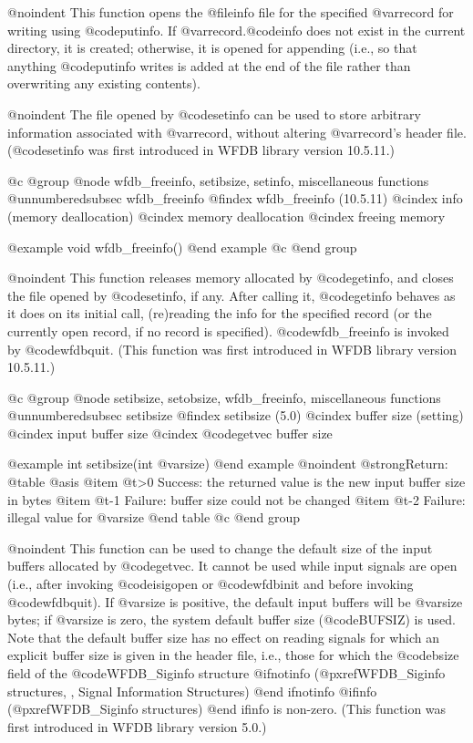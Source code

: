 {{{{{{{{{@noindent
This function opens the @file{info} file for the specified @var{record} for
writing using @code{putinfo}.  If @var{record}.@code{info} does not exist in
the current directory, it is created;  otherwise, it is opened for appending
(i.e., so that anything @code{putinfo} writes is added at the end of the
file rather than overwriting any existing contents).

@noindent
The file opened by @code{setinfo} can be used to store arbitrary information
associated with @var{record}, without altering @var{record}'s header file.
(@code{setinfo} was first introduced in WFDB library version 10.5.11.)

@c @group
@node     wfdb_freeinfo, setibsize, setinfo, miscellaneous functions
@unnumberedsubsec wfdb_freeinfo
@findex wfdb_freeinfo (10.5.11)
@cindex info (memory deallocation)
@cindex memory deallocation
@cindex freeing memory

@example
void wfdb_freeinfo()
@end example
@c @end group

@noindent
This function releases memory allocated by @code{getinfo}, and closes
the file opened by @code{setinfo}, if any.  After calling it, @code{getinfo}
behaves as it does on its initial call, (re)reading the info for the specified
record (or the currently open record, if no record is specified).
@code{wfdb_freeinfo} is invoked by @code{wfdbquit}.
(This function was first introduced in WFDB library version 10.5.11.)

@c @group
@node     setibsize, setobsize, wfdb_freeinfo, miscellaneous functions
@unnumberedsubsec setibsize
@findex setibsize (5.0)
@cindex buffer size (setting)
@cindex input buffer size
@cindex @code{getvec} buffer size

@example
int setibsize(int @var{size})
@end example
@noindent
@strong{Return:}
@table @asis
@item @t{>0}
Success: the returned value is the new input buffer size in bytes
@item @t{-1}
Failure: buffer size could not be changed
@item @t{-2}
Failure: illegal value for @var{size}
@end table
@c @end group

@noindent
This function can be used to change the default size of the input
buffers allocated by @code{getvec}.  It cannot be used while input
signals are open (i.e., after invoking @code{isigopen} or @code{wfdbinit}
and before invoking @code{wfdbquit}).  If @var{size} is positive, the
default input buffers will be @var{size} bytes;  if @var{size} is zero,
the system default buffer size (@code{BUFSIZ}) is used.  Note that
the default buffer size has no effect on reading signals for which
an explicit buffer size is given in the header file, i.e.,
those for which the @code{bsize} field of the @code{WFDB_Siginfo} structure
@ifnotinfo
(@pxref{WFDB_Siginfo structures, , Signal Information Structures})
@end ifnotinfo
@ifinfo
(@pxref{WFDB_Siginfo structures})
@end ifinfo
is non-zero.
(This function was first introduced in WFDB library version 5.0.)

}}}}}}}}}
